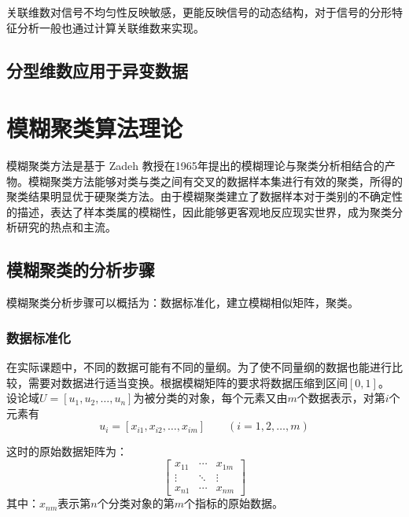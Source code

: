 关联维数对信号不均匀性反映敏感，更能反映信号的动态结构，对于信号的分形特征分析一般也通过计算关联维数来实现。

\subsection{分型维数应用于异变数据}


\section{模糊聚类算法理论}
模糊聚类方法是基于 Zadeh 教授在1965年提出的模糊理论与聚类分析相结合的产物。模糊聚类方法能够对类与类之间有交叉的数据样本集进行有效的聚类，所得的聚类结果明显优于硬聚类方法。由于模糊聚类建立了数据样本对于类别的不确定性的描述，表达了样本类属的模糊性，因此能够更客观地反应现实世界，成为聚类分析研究的热点和主流。

\subsection{模糊聚类的分析步骤}
模糊聚类分析步骤可以概括为：数据标准化，建立模糊相似矩阵，聚类。

\subsubsection{数据标准化}
在实际课题中，不同的数据可能有不同的量纲。为了使不同量纲的数据也能进行比较，需要对数据进行适当变换。根据模糊矩阵的要求将数据压缩到区间$[0,1]$。
设论域$U=[u_1,u_2,\dots,u_n]$为被分类的对象，每个元素又由$m$个数据表示，对第$i$个元素有
$$ u_i=[x_{i1},x_{i2},\dots,x_{im}]\qquad(i=1,2,\dots,m)  $$

这时的原始数据矩阵为：
$$ \left[  \begin{matrix}
x_{11} & \cdots & x_{1m} \\
\vdots & \ddots & \vdots \\
x_{n1} & \cdots & x_{nm}
\end{matrix} \right]  $$
其中：$x_{nm}$表示第$n$个分类对象的第$m$个指标的原始数据。

